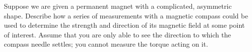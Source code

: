 Suppose we are given a permanent magnet with a
        complicated, asymmetric shape. Describe how a series of
        measurements with a magnetic compass could be used to
        determine the strength and direction of its magnetic field
        at some point of interest. Assume that you are only able to
        see the direction to which the compass needle settles; you
        cannot measure the torque acting on it.
